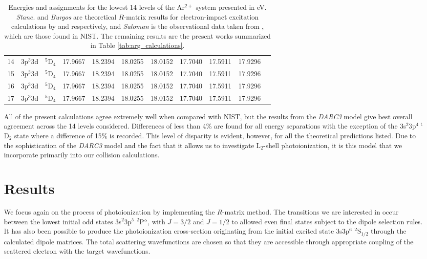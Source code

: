 \begin{table}
\begin{center}
\begin{tabular}{@{} l *9r *1c @{}}
          \multicolumn{1}{c}{14} & 3p$^3$3d & $^5$D$_4$ & 17.9667 & 18.2394 & 18.0255 & 18.0152 & 17.7040 & 17.5911 & 17.9296\\       
                    \multicolumn{1}{c}{15} & 3p$^3$3d & $^5$D$_4$ & 17.9667 & 18.2394 & 18.0255 & 18.0152 & 17.7040 & 17.5911 & 17.9296\\       
                              \multicolumn{1}{c}{16} & 3p$^3$3d & $^5$D$_4$ & 17.9667 & 18.2394 & 18.0255 & 18.0152 & 17.7040 & 17.5911 & 17.9296\\       
                                        \multicolumn{1}{c}{17} & 3p$^3$3d & $^5$D$_4$ & 17.9667 & 18.2394 & 18.0255 & 18.0152 & 17.7040 & 17.5911 & 17.9296\\        
\bottomrule
 \end{tabular}
 \caption{Energies and assignments for the lowest 14 levels of the Ar$^{2+}$ system presented in eV. \textit{Stanc.} and \textit{Burgos} are theoretical $R$-matrix results for electron-impact excitation calculations by \citet{2012EPJD...66...84S} and \citet{2009A&A...500.1253M} respectively, and \textit{Saloman} is the observational data taken from \citet{2010JPCRD..39c3101S}, which are those found in NIST. The remaining results are the present works summarized in Table \ref{tab:arg_calculations}. \label{tab:arg_energy}}
 \end{center}
\end{table}

All of the present calculations agree extremely well when compared with NIST, but the results from the \textit{DARC3} model give best overall agreement across the 14 levels considered. Differences of less than 4\% are found for all energy separations with the exception of the 3s$^2$3p$^4\; ^1$D$_2$ state where a difference of 15\% is recorded. This level of disparity is evident, however, for all the theoretical predictions listed. Due to the sophistication of the \textit{DARC3} model and the fact that it allows us to investigate L$_{2}$-shell photoionization, it is this model that we incorporate primarily into our collision calculations.


\section{Results}\label{sec:arg_results}
We focus again on the process of photoionization by implementing the $R$-matrix method. The transitions we are interested in occur between the lowest initial odd states 3s$^2$3p$^5$ $^2$P$^{\rm{o}}$, with $J = 3/2$ and $J = 1/2$ to allowed even final states subject to the dipole selection rules. It has also been possible to produce the photoionization cross-section originating from the initial excited state 3s3p$^6$ $^2$S$_{1/2}$ through the calculated dipole matrices. The total scattering wavefunctions are chosen so that they are accessible through appropriate coupling of the scattered electron with the target wavefunctions.

